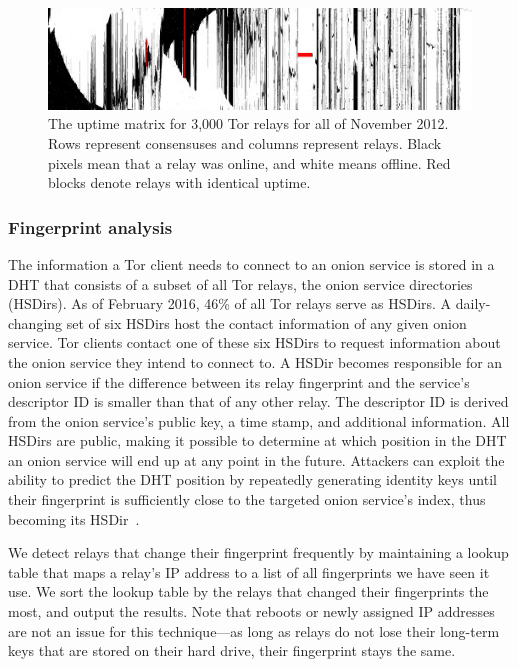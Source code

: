 \begin{figure}[t]
	\centering
	\includegraphics[width=\linewidth]{diagrams/2012-11.jpg}
	\caption{The uptime matrix for 3,000 Tor relays for all of November 2012.
	Rows represent consensuses and columns represent relays.  Black pixels mean
	that a relay was online, and white means offline.  Red blocks denote relays
	with identical uptime.}
	\label{fig:uptime-matrix}
\end{figure}

\subsubsection{Fingerprint analysis}
\label{sec:fingerprint-analysis}
The information a Tor client needs to connect to an onion service is stored in a
DHT that consists of a subset of all Tor relays, the onion service directories
(HSDirs).  As of February 2016, 46\% of all Tor relays serve as HSDirs.  A
daily-changing set of six HSDirs host the contact information of any given
onion service.  Tor clients contact one of these six HSDirs to request
information about the onion service they intend to connect to.  A HSDir becomes
responsible for an onion service if the difference between its relay fingerprint
and the service's descriptor ID is smaller than that of any other relay.  The
descriptor ID is derived from the onion service's public key, a time stamp, and
additional information.
All HSDirs are public, making it possible to determine at which position in the
DHT an onion service will end up at any point in the future.  Attackers can
exploit the ability to predict the DHT position by repeatedly generating
identity keys until their fingerprint is sufficiently close to the targeted
onion service's index, thus becoming its HSDir~\cite[\S~V.A]{Biryukov2013a}.

We detect relays that change their fingerprint frequently by maintaining a
lookup table that maps a relay's IP address to a list of all fingerprints we
have seen it use.  We sort the lookup table by the relays that changed their
fingerprints the most, and output the results.  Note that reboots or newly
assigned IP addresses are not an issue for this technique---as long as relays
do not lose their long-term keys that are stored on their hard drive, their
fingerprint stays the same.

